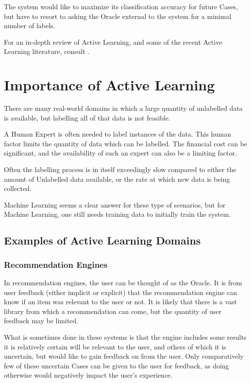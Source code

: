 \documentclass[a4paper,11pt]{report}
\begin{document}
The system would like to maximize its classification accuracy for future Cases, but have to resort to asking the Oracle external to the system for a minimal number of labels.

For an in-depth review of Active Learning, and some of the recent Active Learning literature, consult \citet{Settles2010}.

\section{Importance of Active Learning}
There are many real-world domains in which a large quantity of unlabelled data is available, but labelling all of that data is not feasible. 

A Human Expert is often needed to label instances of the data. This human factor limits the quantity of data which can be labelled. The financial cost can be significant, and the availability of such an expert can also be a limiting factor.

Often the labelling process is in itself exceedingly slow compared to either the amount of Unlabelled data available, or the rate at which new data is being collected. 

Machine Learning seems a clear answer for these type of scenarios, but for Machine Learning, one still needs training data to initially train the system.

\subsection{Examples of Active Learning Domains}
\subsubsection{Recommendation Engines}
In recommendation engines, the user can be thought of as the Oracle. It is from user feedback (either implicit or explicit) that the recommendation engine can know if an item was relevant to the user or not. It is likely that there is a vast library from which a recommendation can come, but the quantity of user feedback may be limited.

What is sometimes done in these systems is that the engine includes some results it is relatively certain will be relevant to the user, and others of which it is uncertain, but would like to gain feedback on from the user. Only comparatively few of these uncertain Cases can be given to the user for feedback, as doing otherwise would negatively impact the user's experience.
\end{document}

